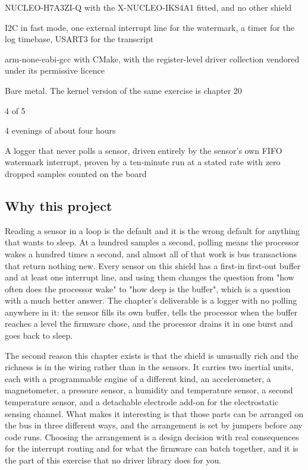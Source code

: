 
\begin{keyfacts}
\item[Board] NUCLEO-H7A3ZI-Q with the X-NUCLEO-IKS4A1 fitted, and no other shield
\item[Peripherals] I2C in fast mode, one external interrupt line for the watermark, a timer for the log timebase, USART3 for the transcript
\item[Toolchain] arm-none-eabi-gcc with CMake, with the register-level driver collection vendored under its permissive licence
\item[Operating system] Bare metal. The kernel version of the same exercise is chapter 20
\item[Difficulty] 4 of 5
\item[Effort] 4 evenings of about four hours
\item[Deliverable] A logger that never polls a sensor, driven entirely by the sensor's own FIFO watermark interrupt, proven by a ten-minute run at a stated rate with zero dropped samples counted on the board
\end{keyfacts}

\subsection*{Why this project}

Reading a sensor in a loop is the default and it is the wrong default for
anything that wants to sleep. At a hundred samples a second, polling means the
processor wakes a hundred times a second, and almost all of that work is bus
transactions that return nothing new. Every sensor on this shield has a
first-in first-out buffer and at least one interrupt line, and using them changes
the question from "how often does the processor wake" to "how deep is the
buffer", which is a question with a much better answer. The chapter's deliverable
is a logger with no polling anywhere in it: the sensor fills its own buffer, tells
the processor when the buffer reaches a level the firmware chose, and the
processor drains it in one burst and goes back to sleep.

The second reason this chapter exists is that the shield is unusually rich and
the richness is in the wiring rather than in the sensors. It carries two inertial
units, each with a programmable engine of a different kind, an accelerometer, a
magnetometer, a pressure sensor, a humidity and temperature sensor, a second
temperature sensor, and a detachable electrode add-on for the electrostatic
sensing channel. What makes it interesting is that those parts can be arranged
on the bus in three different ways, and the arrangement is set by jumpers before
any code runs. Choosing the arrangement is a design decision with real
consequences for the interrupt routing and for what the firmware can batch
together, and it is the part of this exercise that no driver library does for
you.


